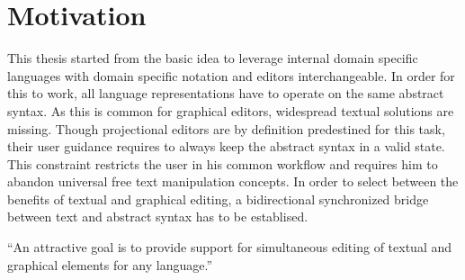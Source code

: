 \section{Motivation}
This thesis started from the basic idea to leverage internal domain specific languages with domain specific notation and editors interchangeable. In order for this to work, all language representations have to operate on the same abstract syntax. As this is common for graphical editors, widespread textual solutions are missing. Though projectional editors are by definition predestined for this task, their user guidance requires to always keep the abstract syntax in a valid state. This constraint restricts the user in his common workflow and requires him to abandon universal free text manipulation concepts. In order to select between the benefits of textual and graphical editing, a bidirectional synchronized bridge between text and abstract syntax has to be establised.  

``An attractive goal is to provide support for simultaneous editing of textual and graphical elements for any language.''\cite{EMP}

